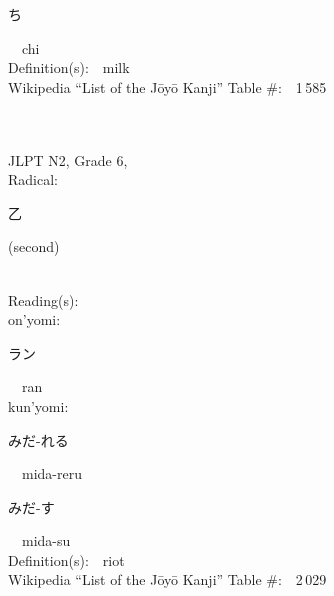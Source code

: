\begin{multicols}{2}
{\hspace*{2em}}{\begin{CJK}{UTF8}{min} ち \end{CJK}}\ \ chi\ \ \\
Definition(s):\ \ milk \\
Wikipedia ``List of the J\=oy\=o Kanji'' Table \#:\ \ 1\,585 \\
\ \ \\
{\fontsize{34pt}{40pt}  }\ \ \\  %
{JLPT N2, Grade 6, \\Radical:\ \ {\begin{CJK}{UTF8}{min} 乙 \end{CJK}} (second) } \\
Reading(s):\ \ \\
{\hspace*{1em}}on'yomi:\ \ \\
{\hspace*{2em}}{\begin{CJK}{UTF8}{min} ラン \end{CJK}}\ \ ran\ \ \\
{\hspace*{1em}}kun'yomi:\ \ \\
{\hspace*{2em}}{\begin{CJK}{UTF8}{min} みだ-れる \end{CJK}}\ \ mida-reru\ \ \\
{\hspace*{2em}}{\begin{CJK}{UTF8}{min} みだ-す \end{CJK}}\ \ mida-su\ \ \\
Definition(s):\ \ riot \\
Wikipedia ``List of the J\=oy\=o Kanji'' Table \#:\ \ 2\,029 \\
\ \ \\
\end{multicols}



